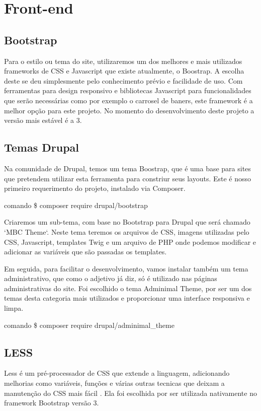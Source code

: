 \section{Front-end}

\subsection{Bootstrap}
Para o estilo ou tema do site, utilizaremos um dos melhores e mais utilizados frameworks de CSS e Javascript \cite{Bootstrap} que existe atualmente, o Boostrap. A escolha deste se deu simplesmente pelo conhecimento prévio e facilidade de uso. Com ferramentas para design responsivo e bibliotecas Javascript para funcionalidades que serão necessárias como por exemplo o carrosel de baners, este framework é a melhor opção para este projeto. No momento do desenvolvimento deste projeto a versão mais estável é a 3.

\subsection{Temas Drupal}
Na comunidade de Drupal, temos um tema Boostrap, que é uma base para sites que pretendem utilizar esta ferramenta para constriur seus layouts. Este é nosso primeiro requerimento do projeto, instalado via Composer.

\TODO comando \$ composer require drupal/bootstrap

Criaremos um sub-tema, com base no Bootstrap para Drupal que será chamado `MBC Theme`. Neste tema teremos os arquivos de CSS, imagens utilizadas pelo CSS, Javascript, templates Twig e um arquivo de PHP onde podemos modificar e adicionar as variáveis que são passadas os templates. 

Em seguida, para facilitar o desenvolvimento, vamos instalar também um tema administrativo, que como o adjetivo já diz, só é utilizado nas páginas administrativas do site. Foi escolhido o tema Adminimal Theme, por ser um dos temas desta categoria mais utilizados e proporcionar uma interface responsiva e limpa.

\TODO comando \$ composer require drupal/adminimal_theme

\subsection{LESS}
Less é um pré-processador de CSS que extende a linguagem, adicionando melhorias como variáveis, funções e várias outras tecnicas que deixam a manutenção do CSS mais fácil \cite{Less}. Ela foi escolhida por ser utilizada nativamente no framework Bootstrap versão 3.

